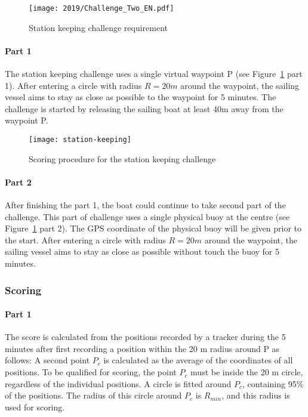 \documentclass[12pt]{article}
\begin{document}
\begin{figure}[H]
  \centering
  \texttt{[image: 2019/Challenge\_Two\_EN.pdf]}
  \caption{Station keeping challenge requirement}
  \label{fig:stationkeeping_requirement}
\end{figure}

\paragraph{Part 1}

The station keeping challenge uses a single virtual waypoint P
(see Figure~\ref{fig:stationkeeping_requirement} part 1). 
After entering a circle with radius $R=20m$ around the waypoint, the 
sailing vessel aims to stay as close as possible to the waypoint for 5 minutes.
The challenge is started by releasing the sailing boat at least 40m away
from the waypoint P.


\begin{figure}[H]
  \centering
  \texttt{[image: station-keeping]}
  \caption{Scoring procedure for the station keeping challenge}
  \label{fig:stationkeeping}
\end{figure}

\paragraph{Part 2}

After finishing the part 1, the boat could continue to take second part of the challenge.
This part of challenge uses a single physical buoy at the centre (see Figure~\ref{fig:stationkeeping_requirement} part 2). 
The GPS coordinate of the physical buoy will be given prior to the start. 
After entering a circle with radius $R=20m$ around the waypoint, the 
sailing vessel aims to stay as close as possible without touch the buoy for 5 minutes.


\subsubsection{Scoring}

\paragraph{Part 1}

The score is calculated from the positions recorded by a tracker during the 5
minutes after first recording a position within the 20 m radius around P as
follows:
A second point $P_c$ is calculated as the average of the coordinates of all
positions. To be qualified for scoring, the point $P_c$ must be
inside the 20 m circle, regardless of the individual positions.
A circle is fitted around $P_c$, containing 95\% of the positions.
The radius of this circle around $P_c$ is $R_{min}$, and this radius is used for
scoring. 
\end{document}
